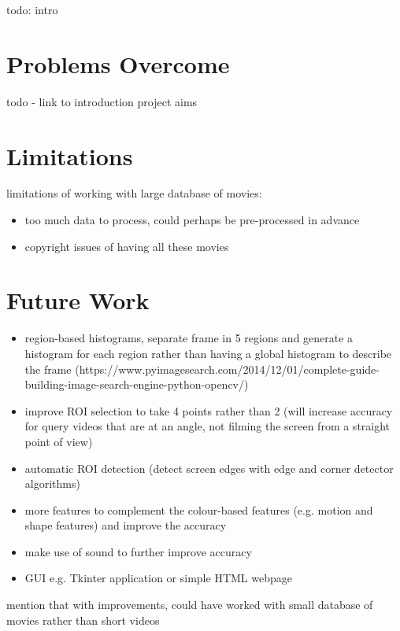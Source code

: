 todo: intro


\section{Problems Overcome}

todo - link to introduction project aims


\section{Limitations}

limitations of working with large database of movies: 
\begin{itemize}
    \item too much data to process, could perhaps be pre-processed in advance
    \item copyright issues of having all these movies
\end{itemize}
    

\section{Future Work}

\begin{itemize}
    \item region-based histograms, separate frame in 5 regions and generate a histogram for each region rather than having a global histogram to describe the frame (https://www.pyimagesearch.com/2014/12/01/complete-guide-building-image-search-engine-python-opencv/)
    \item improve ROI selection to take 4 points rather than 2 (will increase accuracy for query videos that are at an angle, not filming the screen from a straight point of view)
    \item automatic ROI detection (detect screen edges with edge and corner detector algorithms)
    \item more features to complement the colour-based features (e.g. motion and shape features) and improve the accuracy
    \item make use of sound to further improve accuracy
    \item GUI e.g. Tkinter application or simple HTML webpage
\end{itemize} 
mention that with improvements, could have worked with small database of movies rather than short videos
    
